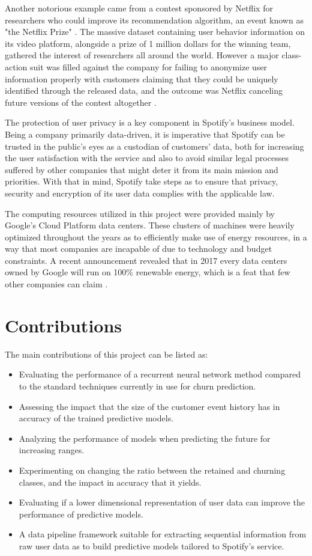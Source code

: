 \documentclass{kththesis}
\begin{document}
Another notorious example came from a contest sponsored by Netflix for researchers who could improve its recommendation algorithm, an event known as "the Netflix Prize" \citep{bennett2007netflix}. The massive dataset containing user behavior information on its video platform, alongside a prize of 1 million dollars for the winning team, gathered the interest of researchers all around the world. However a major class-action suit was filled against the company for failing to anonymize user information properly with customers claiming that they could be uniquely identified through the released data, and the outcome was Netflix canceling future versions of the contest altogether \citep{wired2010netflix}.

The protection of user privacy is a key component in Spotify's business model. Being a company primarily data-driven, it is imperative that Spotify can be trusted in the public's eyes as a custodian of customers' data, both for increasing the user satisfaction with the service and also to avoid similar legal processes suffered by other companies that might deter it from its main mission and priorities. With that in mind, Spotify take steps as to ensure that privacy, security and encryption of its user data complies with the applicable law. 

The computing resources utilized in this project were provided mainly by Google's Cloud Platform data centers. These clusters of machines were heavily optimized throughout the years as to efficiently make use of energy resources, in a way that most companies are incapable of due to technology and budget constraints. A recent announcement revealed that in 2017 every data centers owned by Google will run on 100\% renewable energy, which is a feat that few other companies can claim \citep{google2017renew}.  


\section{Contributions}

The main contributions of this project can be listed as:

\begin{itemize}
\item Evaluating the performance of a recurrent neural network method compared to the standard techniques currently in use for churn prediction.
\item Assessing the impact that the size of the customer event history has in accuracy of the trained predictive models.
\item Analyzing the performance of models when predicting the future for increasing ranges.
\item Experimenting on changing the ratio between the retained and churning classes, and the impact in accuracy that it yields.
\item Evaluating if a lower dimensional representation of user data can improve the performance of predictive models.
\item A data pipeline framework suitable for extracting sequential information from raw user data as to build predictive models tailored to Spotify's service.
\end{itemize}
\end{document}
